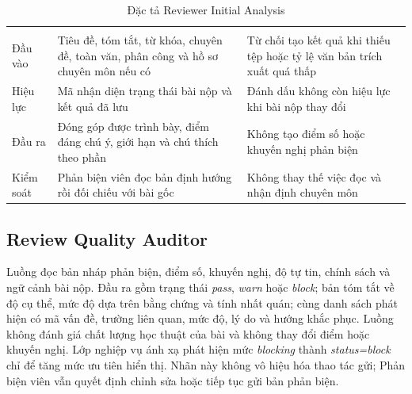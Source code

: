 \begin{longtable}{|T{0.20\textwidth}|T{0.32\textwidth}|T{0.38\textwidth}|}
\caption{Đặc tả Reviewer Initial Analysis}\label{tab:appendix-a-ria}\\
\hline
{} &  &  \\ \hline
\endfirsthead
\hline
{} &  &  \\ \hline
\endhead
Đầu vào & Tiêu đề, tóm tắt, từ khóa, chuyên đề, toàn văn, phân công và hồ sơ chuyên môn nếu có & Từ chối tạo kết quả khi thiếu tệp hoặc tỷ lệ văn bản trích xuất quá thấp \\ \hline
Hiệu lực & Mã nhận diện trạng thái bài nộp và kết quả đã lưu & Đánh dấu không còn hiệu lực khi bài nộp thay đổi \\ \hline
Đầu ra & Đóng góp được trình bày, điểm đáng chú ý, giới hạn và chú thích theo phần & Không tạo điểm số hoặc khuyến nghị phản biện \\ \hline
Kiểm soát & Phản biện viên đọc bản định hướng rồi đối chiếu với bài gốc & Không thay thế việc đọc và nhận định chuyên môn \\ \hline
\end{longtable}

\subsection{Review Quality Auditor}

Luồng đọc bản nháp phản biện, điểm số, khuyến nghị, độ tự tin, chính sách và ngữ cảnh bài nộp. Đầu ra gồm trạng thái \textit{pass}, \textit{warn} hoặc \textit{block}; bản tóm tắt về độ cụ thể, mức độ dựa trên bằng chứng và tính nhất quán; cùng danh sách phát hiện có mã vấn đề, trường liên quan, mức độ, lý do và hướng khắc phục. Luồng không đánh giá chất lượng học thuật của bài và không thay đổi điểm hoặc khuyến nghị. Lớp nghiệp vụ ánh xạ phát hiện mức \textit{blocking} thành \textit{status=block} chỉ để tăng mức ưu tiên hiển thị. Nhãn này không vô hiệu hóa thao tác gửi; Phản biện viên vẫn quyết định chỉnh sửa hoặc tiếp tục gửi bản phản biện.

